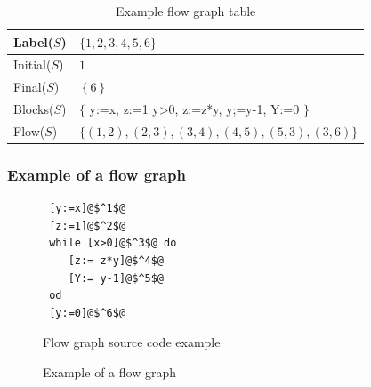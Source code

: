\begin{table}
    \begin{tabular}{l | l }
     Label($S$)   & $\{   1,2,3,4,5,6   \}$ \\
     \hline
     Initial($S$) & $1$ \\
     \hline
     Final($S$)   & $\left\lbrace   6   \right\rbrace$ \\
     \hline
     Blocks($S$)  & $\{$ y:=x, z:=1 y>0, z:=z*y, y;=y-1, Y:=0 $\}$ \\
     \hline
     Flow($S$)    &  $\{ (1,2), (2,3), (3,4), (4,5), (5,3), (3,6) \}$ \\
    \end{tabular}
    \centering
	\caption{Example flow graph table}
	\label{table:example_flow_table}
\end{table}


\subsubsection{Example of a flow graph}

 \begin{figure}
 \begin{lstlisting}
 [y:=x]@$^1$@
 [z:=1]@$^2$@
 while [x>0]@$^3$@ do
    [z:= z*y]@$^4$@
    [Y:= y-1]@$^5$@
 od
 [y:=0]@$^6$@
 \end{lstlisting}
 \label{source:example1}
 \caption{Flow graph source code example}
 \end{figure}

 \begin{figure}
 
 
 \caption{Example of a flow graph}
\centering 
 \end{figure}


